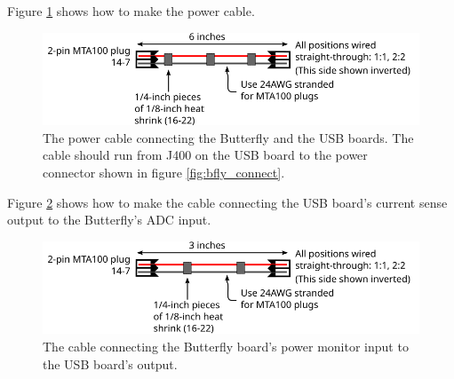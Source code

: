 Figure \ref{fig:bfly_power_cable} shows how to make the power cable.
\begin{figure}[ht]
  \begin{center}
    \includegraphics[clip,scale=1]{figs/butterfly_power_cable}
    \caption{The power cable connecting the Butterfly and the USB
      boards.  The cable should run from J400 on the USB board to the
      power connector shown in figure
      \ref{fig:bfly_connect}.\label{fig:bfly_power_cable} }
  \end{center}
\end{figure}

Figure \ref{fig:isense_cable} shows how to make the cable connecting
the USB board's current sense output to the Butterfly's ADC input.
\begin{figure}[ht]
  \begin{center}
    \includegraphics[clip,scale=1]{figs/current_sense_cable}
    \caption{The cable connecting the Butterfly board's power monitor
      input to the USB board's output.\label{fig:isense_cable} }
  \end{center}
\end{figure}


